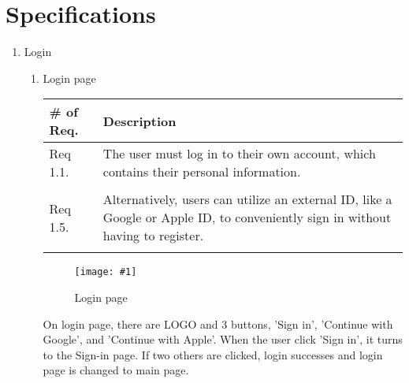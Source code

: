 \newpage
\section{\Large{Specifications}}
\begin{enumerate}[label=\arabic*.]

    \newcommand{\addImage}[2]{
        \begin{figure}[ht]
            \begin{center}
                \texttt{[image: \#1]}
                \caption{#2} %
                \renewcommand{\thefigure}{\thesubsection.\arabic{figure}}
            \end{center}
        \end{figure}
    }

    \newcommand{\requirementTable}[1]{
        \begin{table}[H]
            \center
            \begin{tabular}{m{1.4cm} m{5.5cm}}
                \toprule
                \# of Req. & Description \\
                \midrule
                #1
                \bottomrule
            \end{tabular}
        \end{table}
    }

    \item {\large{Login}}\\
          \begin{enumerate}[label*={\arabic*.},ref=\theenumi.\arabic*]
              \setlength{\itemindent}{0.5cm}
              \item Login page
                    \requirementTable{
                        Req 1.1. & The user must log in to their own account, which contains their personal information.\\\\
                        Req 1.5. & Alternatively, users can utilize an external ID, like a Google or Apple ID, to conveniently sign in without having to register.\\\\
                    }
                    \addImage{
                        imgs/lkj/firstPage.png
                    }{
                        Login page
                    }
                    On login page, there are LOGO and 3 buttons, 'Sign in', 'Continue with Google', and 'Continue with Apple'. When the user click 'Sign in', it turns to the Sign-in page. If two others are clicked, login successes and login page is changed to main page.\\\\
                    \newpage


\end{enumerate}
\end{enumerate}
